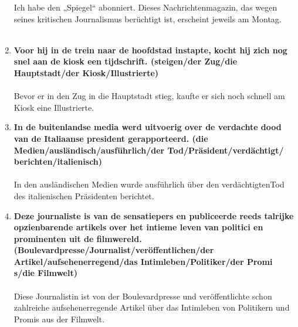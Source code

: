 \documentclass[main.tex]{subfiles}
\begin{document}
\begin{enumerate}
Ich habe den „Spiegel“ abonniert. Dieses Nachrichtenmagazin, das wegen seines kritischen Journalismus berüchtigt ist, erscheint jeweils am Montag.
\\
\\
\item \textbf{Voor hij in de trein naar de hoofdstad instapte, kocht hij zich nog snel aan de kiosk een tijdschrift. (steigen/der Zug/die Hauptstadt/der Kiosk/Illustrierte)}\\ \\
Bevor er in den Zug in die Hauptstadt stieg, kaufte er sich noch schnell  am Kiosk eine Illustrierte.
\\
\item \textbf{In de buitenlandse media werd uitvoerig over de verdachte dood van de Italiaanse president gerapporteerd. (die Medien/ausländisch/ausführlich/der Tod/Präsident/verdächtigt/ berichten/italienisch)} \\ \\
In den ausländischen Medien wurde ausführlich über den verdächtigtenTod des italienischen Präsidenten berichtet.
\\
\item \textbf{Deze journaliste is van de sensatiepers en publiceerde reeds talrijke opzienbarende artikels over het intieme leven van politici en prominenten uit de filmwereld. (Boulevardpresse/Journalist/veröffentlichen/der Artikel/aufsehenerregend/das Intimleben/Politiker/der Promi s/die Filmwelt)} \\ \\
Diese Journalistin ist von der Boulevardpresse und veröffentlichte schon zahlreiche aufsehenerregende Artikel über das Intimleben von Politikern und Promis aus der Filmwelt.

\end{enumerate}
\end{document}
